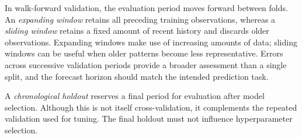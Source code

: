 In walk-forward validation, the evaluation period moves forward between folds.
An \emph{expanding window} retains all preceding training observations, whereas
a \emph{sliding window} retains a fixed amount of recent history and discards
older observations. Expanding windows make use of increasing amounts of data;
sliding windows can be useful when older patterns become less representative.
Errors across successive validation periods provide a broader assessment than
a single split, and the forecast horizon should match the intended prediction
task.

A \emph{chronological holdout} reserves a final period for evaluation after
model selection. Although this is not itself cross-validation, it complements
the repeated validation used for tuning. The final holdout must not influence
hyperparameter selection.
